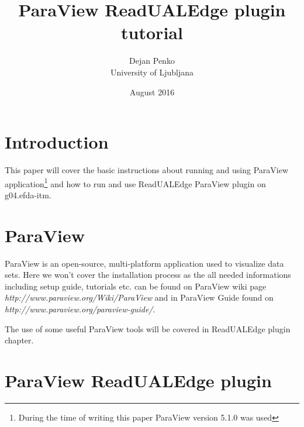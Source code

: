 \documentclass[a4paper,12pt,twoside]{article}
\begin{document}
\pagestyle{plain}
\addtolength{\baselineskip}{0.4ex} %

\renewcommand{\sectionmark}[1]{\markright{\thesection\ \ #1}}

\addtolength{\parskip}{\baselineskip}


\title{ParaView ReadUALEdge plugin\\tutorial}
\author{Dejan Penko\\
University of Ljubljana}
\date{August 2016}

\maketitle


\graphicspath{ {images/} }
\singlespacing
\tableofcontents
\clearpage

\section{\textbf{Introduction}}

This paper will cover the basic instructions about running and using ParaView application\footnote[1]{During the time of writing this paper ParaView version 5.1.0 was used} and how to run and use ReadUALEdge ParaView plugin on g04.efda-itm.

\section{\textbf{ParaView}}

ParaView is an open-source, multi-platform application used to visualize data sets. Here we won't cover the installation process as the all needed informations including setup guide, tutorials etc. can be found on ParaView wiki page \\ \textit{http://www.paraview.org/Wiki/ParaView} and in ParaView Guide found on \\ \textit{http://www.paraview.org/paraview-guide/}.

The use of some useful ParaView tools will be covered in ReadUALEdge plugin chapter.


\section{\textbf{ParaView ReadUALEdge plugin}}
\end{document}
